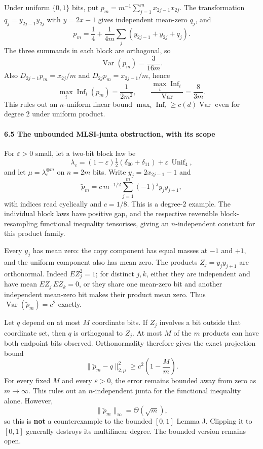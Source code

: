 Under uniform \(\{0,1\}\) bits, put \(p_m=m^{-1}\sum_{j=1}^mx_{2j-1}x_{2j}\). The transformation \(q_j=y_{2j-1}y_{2j}\) with \(y=2x-1\) gives independent mean-zero \(q_j\), and
\[p_m=\frac14+\frac1{4m}\sum_j(y_{2j-1}+y_{2j}+q_j).\]
The three summands in each block are orthogonal, so
\[\operatorname{Var}(p_m)=\frac{3}{16m}.\]
Also \(D_{2j-1}p_m=x_{2j}/m\) and \(D_{2j}p_m=x_{2j-1}/m\), hence
\[\max_i\operatorname{Inf}_i(p_m)=\frac1{2m^2},
\qquad \frac{\max_i\operatorname{Inf}_i}{\operatorname{Var}}=\frac{8}{3m}.\]
This rules out an \(n\)-uniform linear bound \(\max_i\operatorname{Inf}_i\ge c(d)\operatorname{Var}\) even for degree \(2\) under uniform product.

\paragraph{6.5 The unbounded MLSI-junta obstruction, with its scope}\label{the-unbounded-mlsi-junta-obstruction-with-its-scope}

For \(\varepsilon>0\) small, let a two-bit block law be
\[\lambda_\varepsilon=(1-\varepsilon)\tfrac12(\delta_{00}+\delta_{11})
+\varepsilon\,\operatorname{Unif}_{4},\]
and let \(\mu=\lambda_\varepsilon^{\otimes m}\) on \(n=2m\) bits. Write \(y_j=2x_{2j-1}-1\) and
\[\widetilde p_m=c\,m^{-1/2}\sum_{j=1}^m(-1)^jy_jy_{j+1},\]
with indices read cyclically and \(c=1/8\). This is a degree-\(2\) example. The individual block laws have positive gap, and the respective reversible block-resampling functional inequality tensorises, giving an \(n\)-independent constant for this product family.

Every \(y_j\) has mean zero: the copy component has equal masses at \(-1\) and \(+1\), and the uniform component also has mean zero. The products \(Z_j=y_jy_{j+1}\) are orthonormal. Indeed \(E Z_j^2=1\); for distinct \(j,k\), either they are independent and have mean \(E Z_j\,E Z_k=0\), or they share one mean-zero bit and another independent mean-zero bit makes their product mean zero. Thus \(\operatorname{Var}(\widetilde p_m)=c^2\) exactly.

Let \(q\) depend on at most \(M\) coordinate bits. If \(Z_j\) involves a bit outside that coordinate set, then \(q\) is orthogonal to \(Z_j\). At most \(M\) of the \(m\) products can have both endpoint bits observed. Orthonormality therefore gives the exact projection bound
\[\|\widetilde p_m-q\|_{2,\mu}^2
\ge c^2\left(1-\frac Mm\right).\]
For every fixed \(M\) and every \(\varepsilon>0\), the error remains bounded away from zero as \(m\to\infty\). This rules out an \(n\)-independent junta for the functional inequality alone. However,
\[\|\widetilde p_m\|_\infty=\Theta(\sqrt m),\]
so this is \textbf{not} a counterexample to the bounded \([0,1]\) Lemma J. Clipping it to \([0,1]\) generally destroys its multilinear degree. The bounded version remains open.
